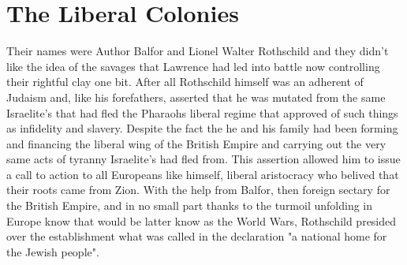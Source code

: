 \documentclass{article}
\begin{document}
\section{The Liberal Colonies}

Their names were Author Balfor and Lionel Walter Rothschild and they didn't like the idea of the savages that Lawrence had led into battle now controlling their rightful clay one bit. After all Rothschild himself was an adherent of Judaism and, like his forefathers, asserted that he was mutated from the same Israelite's that had fled the Pharaohs liberal regime that approved of such things as infidelity and slavery. Despite the fact the he and his family had been forming and financing the liberal wing of the British Empire and carrying out the very same acts of tyranny Israelite's had fled from. This assertion allowed him to issue a call to action to all Europeans like himself, liberal aristocracy who belived that their roots came from Zion. With the help from Balfor, then foreign sectary for the British Empire, and in no small part thanks to the turmoil unfolding in Europe know that would be latter know as the World Wars, Rothschild presided over the establishment what was called in the declaration "a national home for the Jewish people". 
\end{document}
